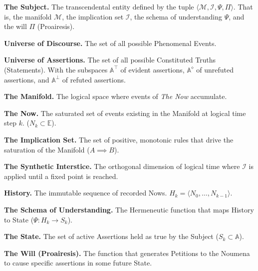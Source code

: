 \documentclass[11pt, a4paper]{article}
\theoremstyle{formalism}
\begin{document}
\begin{description}[style=multiline, leftmargin=3cm, font=\bfseries]

    \item[$\mathcal{S}$] \textbf{The Subject.} The transcendental entity
        defined by the tuple $\langle \mathcal{M}, \mathcal{I}, \Psi, \Pi
        \rangle$. That is, the manifold $\mathcal{M}$, the implication set $\mathcal{I}$,
        the schema of understanding $\Psi$, and the will $\Pi$ (Proairesis).
    
    \item[$\mathbb{E}$] \textbf{Universe of Discourse.} The set of all possible
        Phenomenal Events.
    
    \item[$\mathbb{A}$] \textbf{Universe of Assertions.} The set of all
        possible Constituted Truths (Statements). With the subspaces 
        $\mathbb{A}^\top$ of evident assertions, $\mathbb{A}^\diamond$ of
        unrefuted assertions, and $\mathbb{A}^\bot$ of refuted 
        assertions. 
    
    \item[$\mathcal{M}$] \textbf{The Manifold.} The logical space where events
        of \textit{The Now} accumulate. 
    
    \item[$N^0_k$] \textbf{The Now.} The saturated set of events existing in the
        Manifold at logical time step $k$. ($N_k \subset \mathbb{E}$).
    
    \item[$\mathcal{I}$] \textbf{The Implication Set.} The set of positive,
        monotonic rules that drive the saturation of the Manifold ($A \implies
        B$).
    
    \item[$\sigma$] \textbf{The Synthetic Interstice.} The
        orthogonal dimension of logical time where $\mathcal{I}$ is applied
        until a fixed point is reached.
    
    \item[$H_k$] \textbf{History.} The immutable sequence of recorded Nows.
        $H_k = \langle N_0, \dots, N_{k-1} \rangle$.
    
    \item[$\Psi$] \textbf{The Schema of Understanding.} The Hermeneutic
        function that maps History to State ($\Psi: H_k \to S_k$).
    
    \item[$S_k$] \textbf{The State.} The set of active Assertions held as true
        by the Subject ($S_k \subset \mathbb{A}$).
    
    \item[$\Pi$] \textbf{The Will (Proairesis).} The function that generates 
        Petitions to the Noumena to cause specific assertions in some future State.

\end{description}
\end{document}
